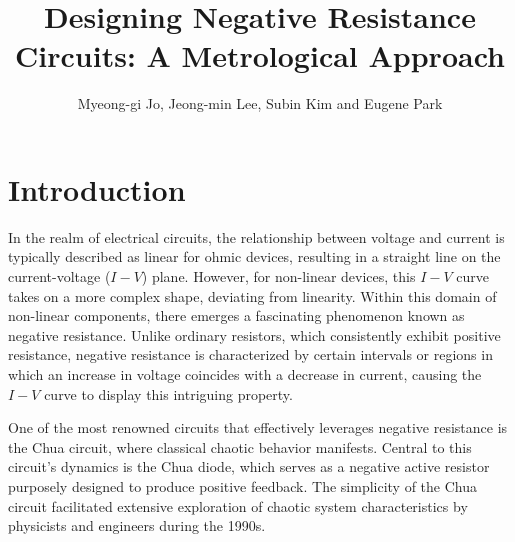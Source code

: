 \documentclass[12pt]{article}
\begin{document}
\title{Designing Negative Resistance Circuits: A Metrological Approach}
\author{Myeong-gi Jo, Jeong-min Lee, Subin Kim and Eugene Park}

\maketitle

\section{Introduction}
\noindent{}



In the realm of electrical circuits, the relationship between voltage and current is typically described as linear for ohmic devices, resulting in a straight line on the current-voltage (\(I-V\)) plane. However, for non-linear devices, this \(I-V\) curve takes on a more complex shape, deviating from linearity. Within this domain of non-linear components, there emerges a fascinating phenomenon known as negative resistance. Unlike ordinary resistors, which consistently exhibit positive resistance, negative resistance is characterized by certain intervals or regions in which an increase in voltage coincides with a decrease in current, causing the \(I-V\) curve to display this intriguing property.

One of the most renowned circuits that effectively leverages negative resistance is the Chua circuit, where classical chaotic behavior manifests. Central to this circuit's dynamics is the Chua diode, which serves as a negative active resistor purposely designed to produce positive feedback. The simplicity of the Chua circuit facilitated extensive exploration of chaotic system characteristics by physicists and engineers during the 1990s\cite{impact_chua}.
\end{document}
